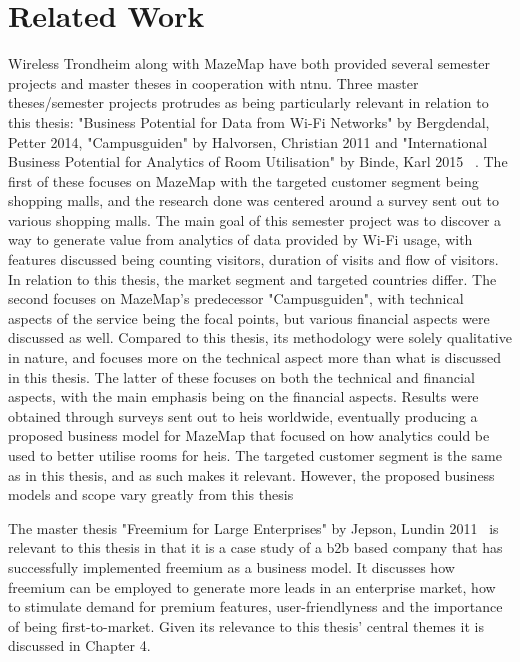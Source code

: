 \section{Related Work}
Wireless Trondheim along with MazeMap have both provided several semester projects and master theses in cooperation with \gls{ntnu}. Three master theses/semester projects protrudes as being particularly relevant in relation to this thesis: "Business Potential for Data from Wi-Fi Networks" by Bergdendal, Petter 2014, "Campusguiden" by Halvorsen, Christian 2011 and "International Business Potential for Analytics of Room Utilisation" by Binde, Karl 2015~\cite{petterbergendal2014} \cite{christianhalvorsen2011} \cite{karlbernhoffbinde2015}. The first of these focuses on MazeMap with the targeted customer segment being shopping malls, and the research done was centered around a survey sent out to various shopping malls. The main goal of this semester project was to discover a way to generate value from analytics of data provided by Wi-Fi usage, with features discussed being counting visitors, duration of visits and flow of visitors. In relation to this thesis, the market segment and targeted countries differ. The second focuses on MazeMap's predecessor "Campusguiden", with technical aspects of the service being the focal points, but various financial aspects were discussed as well. Compared to this thesis, its methodology were solely qualitative in nature, and focuses more on the technical aspect more than what is discussed in this thesis. The latter of these focuses on both the technical and financial aspects, with the main emphasis being on the financial aspects. Results were obtained through surveys sent out to \glspl{hei} worldwide, eventually producing a proposed business model for MazeMap that focused on how analytics could be used to better utilise rooms for \glspl{hei}. The targeted customer segment is the same as in this thesis, and as such makes it relevant. However, the proposed business models and scope vary greatly from this thesis


The master thesis "Freemium for Large Enterprises" by Jepson, Lundin 2011~\cite{jepson2009freemium} is relevant to this thesis in that it is a case study of a \gls{b2b} based company that has successfully implemented freemium as a business model. It discusses how freemium can be employed to generate more leads in an enterprise market, how to stimulate demand for premium features, user-friendlyness and the importance of being first-to-market. Given its relevance to this thesis' central themes it is discussed in Chapter 4.